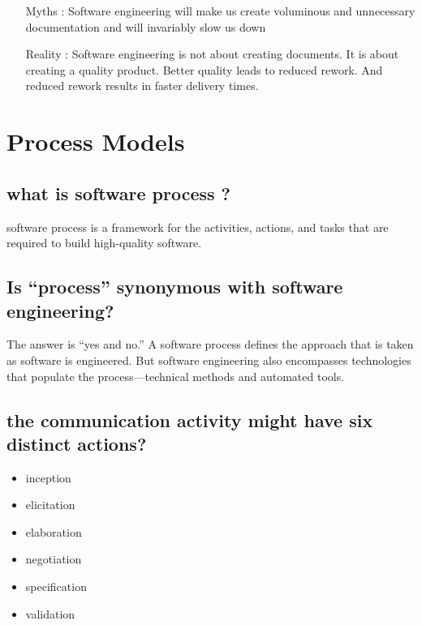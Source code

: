 \documentclass[12pt]{article}
\begin{document}
\begin{itemize}
	\item [Myths :] Software engineering will make us create voluminous and unnecessary
documentation and will invariably slow us down
	\item [Reality :] Software engineering is not about creating documents. It is about
creating a quality product. Better quality leads to reduced rework.
And reduced rework results in faster delivery times.
\end{itemize}

\newpage

\section{Process Models}

\subsection{what is software process ?}

software process is a framework for the activities, actions, and tasks that are required to build high-quality software.



\subsection{Is “process” synonymous with software engineering?}

The answer is “yes and no.” A software process
defines the approach that is taken as software is engineered. But software engineering also encompasses technologies that populate the process—technical methods and automated tools.


\subsection{the communication activity
might have six distinct actions?}

\begin{itemize}
	\item inception
	\item elicitation
	\item elaboration
	\item negotiation
	\item specification
	\item validation
\end{itemize}
\end{document}
